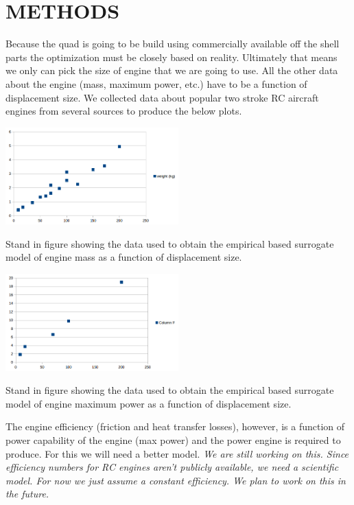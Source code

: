 \documentclass[letterpaper, 10 pt, conference]{ieeeconf}  %
\makeatletter
\newenvironment{figurehere}
  {\def\@captype{figure}}
  {}
\makeatother
\begin{document}
	
\section{METHODS}

Because the quad is going to be build using commercially available off the shell parts the optimization must be closely based on reality.  Ultimately that means we only can pick the size of engine that we are going to use.  All the other data about the engine (mass, maximum power, etc.) have to be a function of displacement size.  We collected data about popular two stroke RC aircraft engines from several sources to produce the below plots. 

\begin{figurehere}
	\includegraphics[width=0.5\textwidth]{mass.png}
	\caption{Stand in figure showing the data used to obtain the empirical based surrogate model of engine mass as a function of displacement size.}
		\label{fig:mass}
\end{figurehere}

\begin{figurehere}
	\includegraphics[width=0.5\textwidth]{max_power.png}
	\caption{Stand in figure showing the data used to obtain the empirical based surrogate model of engine maximum power as a function of displacement size.}
		\label{fig:power}
\end{figurehere}

The engine efficiency (friction and heat transfer losses), however, is a function of power capability of the engine (max power) and the power engine is required to produce.  For this we will need a better model.  \textit{We are still working on this. Since efficiency numbers for RC engines aren't publicly available, we need a scientific model.  For now we just assume a constant efficiency. We plan to work on this in the future.} 
\end{document}
